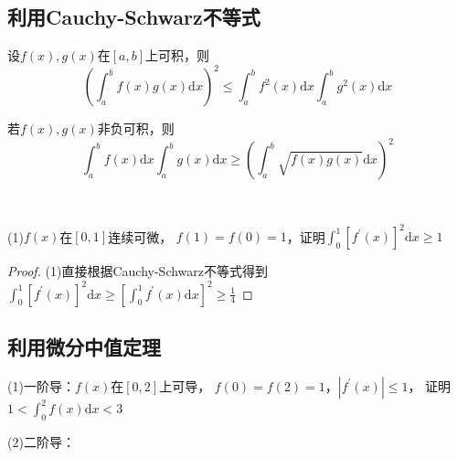 \subsection{利用Cauchy-Schwarz不等式}

\begin{theorem}
  设$f(x),g(x)$在$[a,b]$上可积，则
  \begin{equation*}
    \left( \int_a^b f(x)g(x)\mathrm{d} x \right)^2 \leq \int_a^b f^2(x)\mathrm{d} x \int_a^b g^2(x)\mathrm{d} x
  \end{equation*}
\end{theorem}

\begin{corollary}
  若$f(x),g(x)$非负可积，则
  \begin{equation*}
    \int_a^b f(x)\mathrm{d} x \int_a^b g(x)\mathrm{d} x \geq \left( \int_a^b \sqrt{f(x)g(x)}\mathrm{d} x \right)^2
  \end{equation*}
\end{corollary}

~

\begin{exercise}[一些经典题目]
  (1)$f(x)$在$[0,1]$连续可微，
  $f(1) = f(0) = 1$，证明$\int_0^1 [f^{\prime}(x)]^2 \mathrm{d} x \geq 1$
\end{exercise}

\begin{proof}
  (1)直接根据Cauchy-Schwarz不等式得到$\int_0^1 [f^{\prime}(x)]^2 \mathrm{d} x \geq \left[ \int_0^1 f^{\prime}(x)\mathrm{d} x \right]^2 \geq \frac{1}{4}$
\end{proof}

\subsection{利用微分中值定理}

\begin{exercise}[几道具体分段题]
  (1)一阶导：$f(x)$在$[0,2]$上可导，
  $f(0) = f(2) = 1$，$|f^{\prime}(x)| \leq 1$，
  证明$1 < \int_0^2 f(x)\mathrm{d} x < 3$

  (2)二阶导：
\end{exercise}

